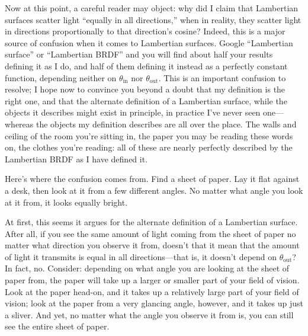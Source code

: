 Now at this point, a careful reader may object: why did I claim that Lambertian surfaces scatter light ``equally in all directions,'' when in reality, they scatter light in directions proportionally to that direction's cosine? Indeed, this is a major source of confusion when it comes to Lambertian surfaces. Google ``Lambertian surface'' or ``Lambertian BRDF'' and you will find about half your results defining it as I do, and half of them defining it instead as a perfectly constant function, depending neither on $\theta_{\textrm{in}}$ nor $\theta_{\textrm{out}}$. This is an important confusion to resolve; I hope now to convince you beyond a doubt that my definition is the right one, and that the alternate definition of a Lambertian surface, while the objects it describes might exist in principle, in practice I've never seen one---whereas the objects my definition describes are all over the place. The walls and ceiling of the room you're sitting in, the paper you may be reading these words on, the clothes you're reading: all of these are nearly perfectly described by the Lambertian BRDF as I have defined it.

Here's where the confusion comes from. Find a sheet of paper. Lay it flat against a desk, then look at it from a few different angles. No matter what angle you look at it from, it looks equally bright.

At first, this seems it argues for the alternate definition of a Lambertian surface. After all, if you see the same amount of light coming from the sheet of paper no matter what direction you observe it from, doesn't that it mean that the amount of light it transmits is equal in all directions---that is, it doesn't depend on $\theta_{\textrm{out}}$? In fact, no. Consider: depending on what angle you are looking at the sheet of paper from, the paper will take up a larger or smaller part of your field of vision. Look at the paper head-on, and it takes up a relatively large part of your field of vision; look at the paper from a very glancing angle, however, and it takes up just a sliver. And yet, no matter what the angle you observe it from is, you can still see the entire sheet of paper. 

